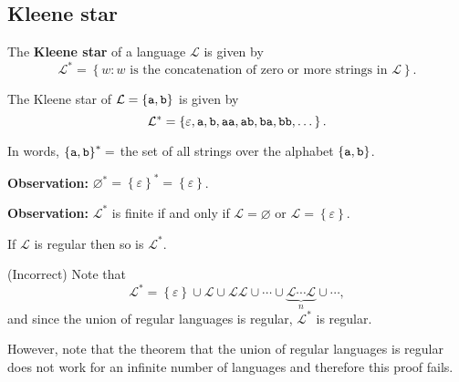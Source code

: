 \documentclass{notes}
\begin{document}
\newpage

\subsection{Kleene star}

\begin{defn}
  The {\boldmath \bfseries Kleene star} of a language $\mathcal L$ is given by 
  \[
    \mathcal L^* = \left \{ w : \text{$w$ is the concatenation of zero or more strings in $\mathcal L$} \right \}.
  \]
\end{defn}

\begin{eg}
  The Kleene star of $\mathcal L = \left \{ \verb~a~, \verb~b~ \right \}$ is given by 
  \[
    \mathcal L^* = \left \{ \varepsilon, \verb~a~, \verb~b~, \verb~aa~, \verb~ab~, \verb~ba~, \verb~bb~, \dots \right \}.
  \]
  
  In words, $\left \{ \verb~a~, \verb~b~ \right \}^* = $ the set of all strings over the alphabet $\left \{ \verb~a~, \verb~b~ \right \}$.
\end{eg}

{\boldmath \bfseries Observation: } $\varnothing^* = \left \{ \varepsilon \right \}^* = \left \{ \varepsilon \right \}$.

{\boldmath \bfseries Observation: } $\mathcal L^*$ is finite if and only if $\mathcal L = \varnothing$ or $\mathcal L = \left \{ \varepsilon \right \}$.

\begin{thm}
  If $\mathcal L$ is regular then so is $\mathcal L^*$.
\end{thm}

\begin{prf}
  {\color{red} (Incorrect)} Note that 
  \[
    \mathcal L^* = \left \{ \varepsilon \right \} \cup \mathcal L \cup \mathcal L \mathcal L \cup \cdots \cup \underbrace{\mathcal L \cdots \mathcal L}_{n} \cup \cdots, 
  \]
  and since the union of regular languages is regular, $\mathcal L^*$ is regular.
  
  However, note that the theorem that the union of regular languages is regular does not work for an infinite number of languages and therefore this proof fails.
\end{prf}
\end{document}
